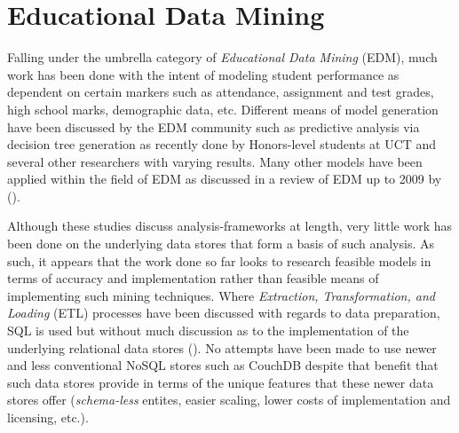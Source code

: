 \section{Educational Data Mining}
Falling under the umbrella category of \textit{Educational Data Mining} (EDM), much work has been done with the intent of modeling student performance as dependent on certain markers such as attendance, assignment and test grades, high school marks, demographic data, etc. Different means of model generation have been discussed by the EDM community such as predictive analysis via decision tree generation as recently done by Honors-level students at UCT \cite{Balestra2017,casper2017} and several other researchers \cite{Qasem20016,Dimitris,zebun2005,Mierle:2005} with varying results. Many other models have been applied within the field of EDM as discussed in a review of EDM up to 2009 by (\cite{bakerEdMiningSummary}).

Although these studies discuss analysis-frameworks at length, very little work has been done on the underlying data stores that form a basis of such analysis. As such, it appears that the work done so far looks to research feasible models in terms of accuracy and implementation rather than feasible means of implementing such mining techniques. Where \textit{Extraction, Transformation, and Loading} (ETL) processes have been discussed with regards to data preparation, SQL is used but without much discussion as to the implementation of the underlying relational data stores (\cite{Balestra2017,casper2017,Mierle:2005}). No attempts have been made to use newer and less conventional NoSQL stores such as CouchDB despite that benefit that such data stores provide in terms of the unique features that these newer data stores offer (\textit{schema-less} entites, easier scaling, lower costs of implementation and licensing, etc.).